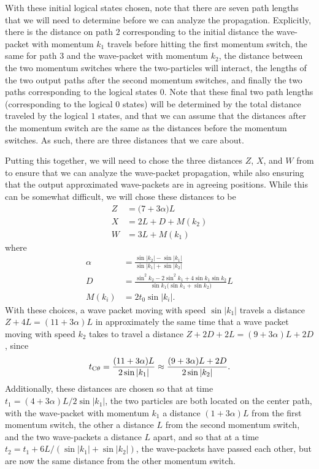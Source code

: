\documentclass[../thesis-main/thesis-main]{subfiles}
\begin{document}
With these initial logical states chosen, note that there are seven path lengths that we will need to determine before we can analyze the propagation.  Explicitly, there is the distance on path $2$ corresponding to the initial distance the wave-packet with momentum $k_1$ travels before hitting the first momentum switch, the same for path $3$ and the wave-packet with momentum $k_2$, the distance between the two momentum switches where the two-particles will interact, the lengths of the two output paths after the second momentum switches, and finally the two paths corresponding to the logical states $0$.  Note that these final two path lengths (corresponding to the logical $0$ states) will be determined by the total distance traveled by the logical $1$ states, and that we can assume that the distances after the momentum switch are the same as the distances before the momentum switches.  As such, there are three distances that we care about.


Putting this together, we will need to chose the three distances $Z$, $X$, and $W$ from  to ensure that we can analyze the wave-packet propagation, while also ensuring that the output approximated wave-packets are in agreeing positions.  While this can be somewhat difficult, we will chose these distances to be
\begin{align}
  Z & = \big(7 + 3 \alpha\big) L \label{eq:Z_eq} \\
  X & = 2L + D+M(k_2) \label{eq:X_eq}\\
  W & = 3L + M(k_1) \label{eq:W_eq}
\end{align}
where
\begin{align}
  \alpha &= \frac{ \sin |k_2| - \sin |k_1|}{\sin |k_1| + \sin |k_2|}\\
  D &= \frac{ \sin^2 k_2 - 2 \sin^2 k_1 + 4 \sin k_1 \sin k_2}{\sin k_1 \big( \sin k_1 + \sin k_2\big)} L \\
  M(k_i) & = 2 t_0 \sin |k_i|.
\end{align}
With these choices, a wave packet moving with speed $\sin |k_1|$ travels a distance $Z+4L=(11+ 3\alpha)L$ in approximately the same time that a wave packet moving with speed $k_2$ takes to travel a distance $Z+2D + 2L=(9+3\alpha)L+2D$, since
\begin{align}
  t_{\mathrm{C}\theta}=\frac{(11 + 3 \alpha)L}{2 \sin |k_1|} \approx\frac{(9 + 3 \alpha)L + 2 D}{2\sin |k_2|}.
  \label{eq:tcd_defn}
\end{align}
Additionally, these distances are chosen so that at time $t_1 = (4 + 3\alpha)L/2\sin |k_1|$, the two particles are both located on the center path, with the wave-packet with momentum $k_1$ a distance $(1 + 3\alpha)L$ from the first momentum switch, the other a distance $L$ from the second momentum switch, and the two wave-packets a distance $L$ apart, and so that at a time $t_2 = t_1 + 6L/(\sin |k_1| + \sin |k_2|)$, the wave-packets have passed each other, but are now the same distance from the other momentum switch.
\end{document}
